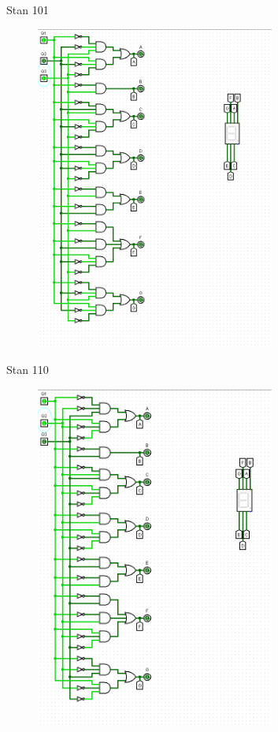 \documentclass[]{article}
\begin{document}
\newpage
Stan 101
\begin{figure}[H]
	\centering
	\includegraphics[width=0.7\textwidth]{CZTERY_101.png}
\end{figure}
\newpage
Stan 110
\begin{figure}[H]
	\centering
	\includegraphics[width=0.7\textwidth]{CZTERY_110.png}
\end{figure}
\end{document}
